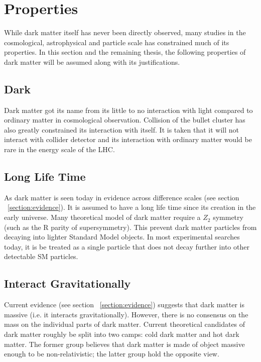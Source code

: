 

\section{Properties}
\label{section:properties}
While dark matter itself has never been directly observed, many studies in the cosmological, astrophysical and particle scale has constrained much of its properties. In this section and the remaining thesis, the following properties of dark matter will be assumed along with its justifications.

\subsection{Dark}

Dark matter got its name from its little to no interaction with light compared to ordinary matter in cosmological observation. Collision of the bullet cluster has also greatly constrained its interaction with itself.  
It is taken that it will not interact with collider detector and its interaction with ordinary matter would be rare in the energy scale of the LHC. 

\subsection{Long Life Time}

As dark matter is seen today in evidence across difference scales (see section ~\ref{section:evidence}). It is assumed to have a long life time since its creation in the early universe. Many theoretical model of dark matter require a $Z_{2}$ symmetry (such as the R parity of supersymmetry). This prevent dark matter particles from decaying into lighter Standard Model objects. In most experimental searches today, it is be treated as a single particle that does not decay further into other detectable SM particles. ~\cite{boveia2018dark}


\subsection{Interact Gravitationally}
Current evidence (see section ~\ref{section:evidence}) suggests that dark matter is massive (i.e. it interacts gravitationally). However, there is no consensus on the mass on the individual parts of dark matter. Current theoretical candidates of dark matter roughly be split into two camps: cold dark matter and hot dark matter. The former group believes that dark matter is made of object massive enough to be non-relativistic; the latter group hold the opposite view. 

